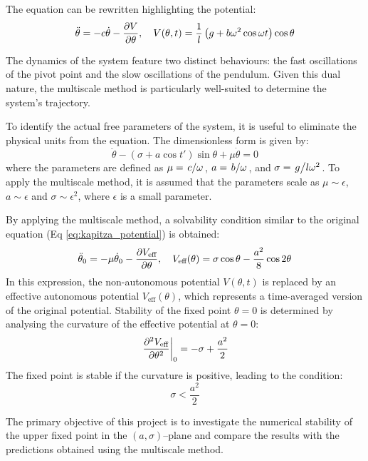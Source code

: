 The equation can be rewritten highlighting the potential:
\begin{equation} \label{eq:kapitza_potential}
    \ddot{\theta} = -c \dot{\theta} - \pdv{V}{\theta}, \quad V(\theta, t) = \frac{1}{l} \left( g + b \omega^2 \cos{\omega t} \right) \cos{\theta}
\end{equation}

The dynamics of the system feature two distinct behaviours: the fast oscillations of the pivot point and the slow oscillations of the pendulum. Given this dual nature, the multiscale method is particularly well-suited to determine the system's trajectory.

To identify the actual free parameters of the system, it is useful to eliminate the physical units from the equation. The dimensionless form is given by:
\begin{equation}
    \ddot{\theta} - ( \sigma + a \cos{t'}) \sin \theta + \mu \dot{\theta} = 0
\end{equation}
where the parameters are defined as $\mu = \flatfrac{c}{\omega}$, $a = \flatfrac{b}{\omega}$, and $\sigma = \flatfrac{g}{l \omega^2}$. To apply the multiscale method, it is assumed that the parameters scale as $\mu \sim \epsilon$, $a \sim \epsilon$ and $\sigma \sim \epsilon^2$, where $\epsilon$ is a small parameter.

By applying the multiscale method, a solvability condition similar to the original equation (Eq \eqref{eq:kapitza_potential}) is obtained:
\begin{equation*}
    \ddot{\theta}_0 = - \mu \dot{\theta}_0 - \pdv{V_\text{eff}}{\theta}, \quad V_\text{eff}(\theta) = \sigma \cos \theta - \frac{a^2}{8} \cos 2 \theta
\end{equation*}
In this expression, the non-autonomous potential $V(\theta, t)$ is replaced by an effective autonomous potential $V_\text{eff}(\theta)$, which represents a time-averaged version of the original potential.
Stability of the fixed point $\theta = 0$ is determined by analysing the curvature of the effective potential at $\theta = 0$:
\begin{equation}
    \eval{\pdv[2]{V_\text{eff}}{\theta}}_0 = -\sigma + \frac{a^2}{2}
\end{equation}
The fixed point is stable if the curvature is positive, leading to the condition:
\begin{equation}
    \sigma < \frac{a^2}{2}
\end{equation}

The primary objective of this project is to investigate the numerical stability of the upper fixed point in the $(a, \sigma)$--plane and compare the results with the predictions obtained using the multiscale method.